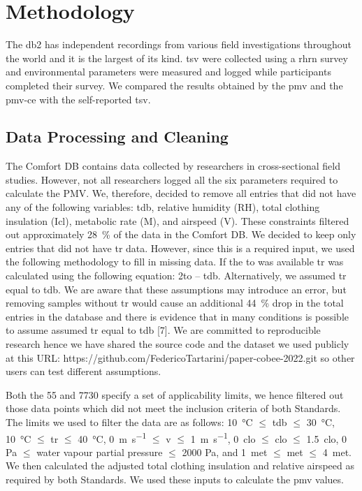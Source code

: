 
\section{Methodology}\label{sec:methodology}

    The \gls{db2} has  independent recordings from various field investigations throughout the world and it is the largest of its kind.
    \Ac{tsv} were collected using a \gls{rhrn} survey and environmental parameters were measured and logged while participants completed their survey.
    We compared the results obtained by the \ac{pmv} and the \gls{pmv-ce} with the self-reported \ac{tsv}.

\subsection{Data Processing and Cleaning}\label{subsec:data-processing-and-cleaning}
The Comfort DB contains data collected by researchers in cross-sectional field studies.
However, not all researchers logged all the six parameters required to calculate the PMV.\@
We, therefore, decided to remove all entries that did not have any of the following variables: tdb, relative humidity (RH), total clothing insulation (Icl), metabolic rate (M), and airspeed (V).
These constraints filtered out approximately \qty{28}{\percent} of the data in the Comfort DB.\@
We decided to keep only entries that did not have \ac{tr} data.
However, since this is a required input, we used the following methodology to fill in missing data.
If the \ac{to} was available \ac{tr} was calculated using the following equation: 2to – tdb.
Alternatively, we assumed \ac{tr} equal to \ac{tdb}.
We are aware that these assumptions may introduce an error, but removing samples without \ac{tr} would cause an additional \qty{44}{\percent} drop in the total entries in the database and there is evidence that in many conditions is possible to assume assumed \ac{tr} equal to tdb [7].
We are committed to reproducible research hence we have shared the source code and the dataset we used publicly at this URL: https://github.com/FedericoTartarini/paper-cobee-2022.git so other users can test different assumptions.

Both the \gls{55} and \gls{7730} specify a set of applicability limits, we hence filtered out those data points which did not meet the inclusion criteria of both Standards.
The limits we used to filter the data are as follows: \qty{10}{\celsius} $\leq$ \ac{tdb} $\leq$ \qty{30}{\celsius}, \qty{10}{\celsius} $\leq$ \ac{tr} $\leq$ \qty{40}{\celsius}, \qty{0}{\m\per\s} $\leq$ \ac{v} $\leq$ \qty{1}{\m\per\s}, \qty{0}{clo} $\leq$ \ac{clo} $\leq$ \qty{1.5}{clo}, 0 Pa $\leq$ water vapour partial pressure $\leq$ 2000 Pa, and \qty{1}{met} $\leq$ \ac{met} $\leq$ \qty{4}{met}.
We then calculated the adjusted total clothing insulation and relative airspeed as required by both Standards.
We used these inputs to calculate the \ac{pmv} values.

